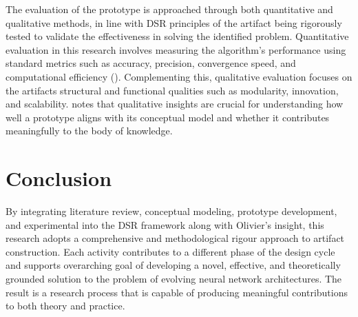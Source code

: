 \parbreak\noindent The evaluation of the prototype is approached through both quantitative and qualitative methods, in line with DSR principles of the artifact being rigorously tested to validate the effectiveness in solving the identified problem. Quantitative evaluation in this research involves measuring the algorithm's performance using standard metrics such as accuracy, precision, convergence speed, and computational efficiency (\cite{gregar2023research}).  Complementing this, qualitative evaluation focuses on the artifacts structural and functional qualities such as modularity, innovation, and scalability. \cite{olivier2009information} notes that qualitative insights are crucial for understanding how well a prototype aligns with its conceptual model and whether it contributes meaningfully to the body of knowledge.

\section{Conclusion}
By integrating literature review, conceptual modeling, prototype development, and experimental into the DSR framework along with Olivier's insight, this research adopts a comprehensive and methodological rigour approach to artifact construction. Each activity contributes to a different phase of the design cycle and supports overarching goal of developing a novel, effective, and theoretically grounded solution to the problem of evolving neural network architectures. The result is a research process that is capable of producing meaningful contributions to both theory and practice.